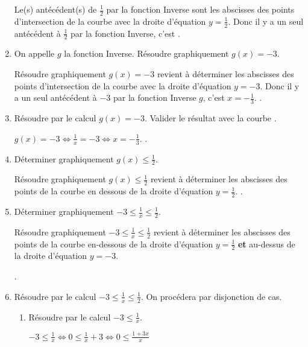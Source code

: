 \begin{enumerate}
Le(s) antécédent(s) de  $\frac{1}{2}$ par la fonction Inverse sont les abscisses des points d'intersection de la courbe avec la droite d'équation $y=\frac{1}{2}$. Donc il y a un seul antécédent à $\frac{1}{2}$ par la fonction Inverse, c'est .

\item  On appelle $g$ la fonction Inverse. Résoudre graphiquement $g(x)=-3$.

Résoudre graphiquement $g(x)=-3$ revient à déterminer les abscisses des points d'intersection de la courbe avec la droite d'équation $y=-3$. Donc il y a un seul antécédent à $-3$ par la fonction Inverse $g$, c'est $x=-\frac{1}{3}$. .

\item  Résoudre par le calcul $g(x)=-3$. Valider le résultat avec la courbe .

$g(x)=-3 \Longleftrightarrow \frac{1}{x} = -3 \Longleftrightarrow x=-\frac{1}{3}$. .


\item  Déterminer graphiquement $g(x)\leq \frac{1}{2}$.

Résoudre graphiquement $g(x)\leq \frac{1}{2}$ revient à déterminer les abscisses des points de la courbe en dessous de la droite d'équation $y=\frac{1}{2}$. \fbox{$S=\left]-\infty;0 \right[ \cup \left[2;+\infty \right[ $}.

 
\item  Déterminer graphiquement $-3 \leq \frac{1}{x} \leq \frac{1}{2}$. 

Résoudre graphiquement $-3 \leq \frac{1}{x} \leq \frac{1}{2}$ revient à déterminer les abscisses des points de la courbe en-dessous de la droite d'équation $y=\frac{1}{2}$ \textbf{et} au-dessus de la droite d'équation $y=-3$. 

\fbox{$S=\left]-\infty;-\frac{1}{3}  \right[ \cup \left[2;+\infty \right[ $}.



\item  Résoudre par le calcul $-3 \leq \frac{1}{x} \leq \frac{1}{2}$. On procédera par disjonction de cas.




\begin{enumerate}

\item  Résoudre par le calcul $-3 \leq \frac{1}{x} $.

$-3 \leq \frac{1}{x} \Longleftrightarrow  0 \leq \frac{1}{x}+3  \Longleftrightarrow  0 \leq \frac{1+3x}{x} $


\end{enumerate}
\end{enumerate}
